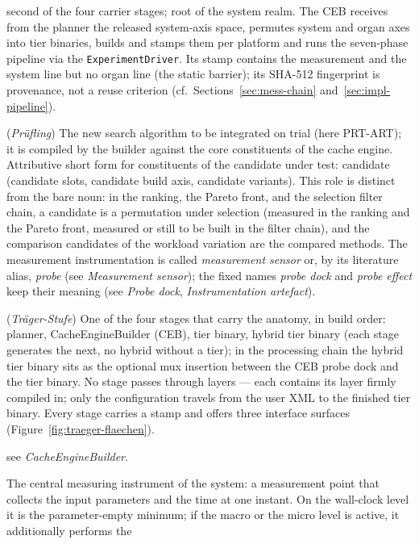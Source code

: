 \begin{description}
  second of the four carrier stages; root of the system realm. The CEB receives from the planner
  the released system-axis space, permutes system and organ axes into tier binaries, builds and
  stamps them per platform and runs the seven-phase pipeline via the \texttt{ExperimentDriver}. Its
  stamp contains the measurement and the system line but no organ line (the static barrier); its
  SHA-512 fingerprint is provenance, not a reuse criterion
  (cf.\ Sections~\ref{sec:mess-chain} and~\ref{sec:impl-pipeline}).
  \item[Candidate under test] (\emph{Prüfling}) The new search algorithm to be integrated on trial
  (here PRT-ART); it is compiled by the builder against the core constituents of the cache engine.
  Attributive short form for constituents of the candidate under test: candidate (candidate slots,
  candidate build axis, candidate variants). This role is distinct from the bare noun: in the
  ranking, the Pareto front, and the selection filter chain, a candidate is a permutation under
  selection (measured in the ranking and the Pareto front, measured or still to be built in the
  filter chain), and the comparison candidates of the workload variation are the compared methods.
  The measurement instrumentation is called \emph{measurement sensor} or, by its literature alias,
  \emph{probe} (see \emph{Measurement sensor}); the fixed names \emph{probe dock} and
  \emph{probe effect} keep their meaning (see \emph{Probe dock}, \emph{Instrumentation artefact}).
  \item[Carrier stage] (\emph{Träger-Stufe}) One of the four stages that carry the anatomy, in
  build order: planner, CacheEngineBuilder (CEB), tier binary, hybrid tier binary (each stage generates
  the next, no hybrid without a tier); in the processing chain the hybrid tier binary sits as the
  optional mux insertion between the CEB probe dock and the tier binary. No stage
  passes through layers --- each contains its layer firmly compiled in; only the configuration
  travels from the user XML to the finished tier binary. Every stage carries a stamp and offers
  three interface surfaces (Figure~\ref{fig:traeger-flaechen}).
  \item[CEB] see \emph{CacheEngineBuilder}.
  \item[checkpoint\_measure] The central measuring instrument of the system: a measurement point
  that collects the input parameters and the time at one instant. On the wall-clock level it is the
  parameter-empty minimum; if the macro or the micro level is active, it additionally performs the

\end{description}
